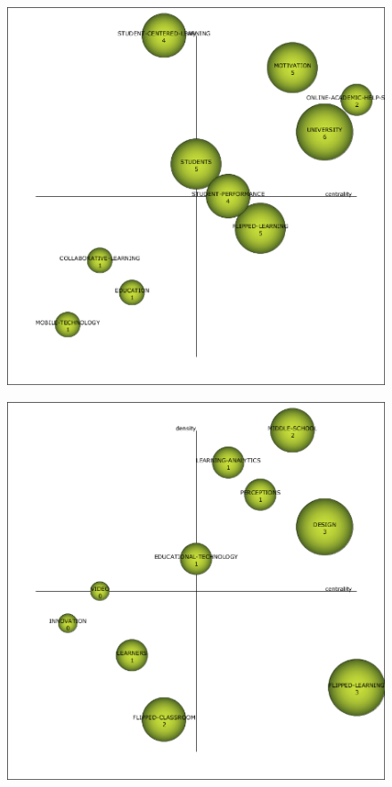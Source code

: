 \documentclass{textolivre}
\begin{document}
\begin{figure}[htbp]
\begin{minipage}{.45\textwidth}
 \label{fig04b}
 \end{minipage}
 \par\vspace{2ex}
 \begin{minipage}{.45\textwidth}
 \includegraphics[width=\textwidth]{Fig04c.png}
 \label{fig04c}
 \end{minipage}
 \hfill
 \begin{minipage}{.45\textwidth}
 \includegraphics[width=\textwidth]{Fig04d.png}

\end{minipage}
\end{figure}
\end{document}
